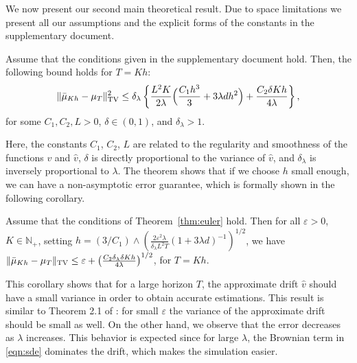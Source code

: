 We now present our second main theoretical result. Due to space limitations we present all our assumptions and the explicit forms of the constants in the supplementary document. 
\vspace{-5pt}
\begin{thm}
\label{thm:euler}
Assume that the conditions given in the supplementary document hold. Then, the following bound holds for $T=Kh$:
\begin{align}
\| \bar{\mu}_{Kh} - \mu_T \|_{\textnormal{TV}}^2 \leq \delta_\lambda \left \lbrace  \frac{L^2 K}{2\lambda} \Bigl( \frac{C_1 h^3}{3} + 3 \lambda d h^2 \Bigr) + \frac{C_2  \delta K h}{4\lambda} \right \rbrace	,
\end{align} 
for some $C_1,C_2,L >0$, $\delta \in (0,1)$, and $\delta_\lambda >1$.  %
\end{thm}
Here, the constants $C_1$, $C_2$, $L$ are related to the regularity and smoothness of the functions $v$ and $\hat{v}$, $\delta$ is directly proportional to the variance of $\hat{v}$, and $\delta_\lambda$ is inversely proportional to $\lambda$. The theorem shows that 
if we choose $h$ small enough, we can have a non-asymptotic error guarantee, which is formally shown in the following corollary. 
\vspace{-5pt}
\begin{cor}
  \label{coro:precision}
  Assume that the conditions of Theorem~\ref{thm:euler} hold. Then for all $\varepsilon >0$, $K \in \mathbb{N}_+$, setting
$h = (3/C_1)\wedge\left(\frac{2 \varepsilon^2 \lambda}{\delta_\lambda L^2 T}(1+3\lambda d)^{-1}\right)^{1/2}$, %
  we have
    $\| \bar{\mu}_{Kh} - \mu_T \|_{\textnormal{TV}} \leq \varepsilon + \left(\frac{C_2 \delta_\lambda \delta K h}{4\lambda}\right)^{1/2} $, for $T=Kh$. 
\end{cor}
This corollary shows that for a large horizon $T$, the approximate drift $\hat{v}$ should have a small variance in order to obtain accurate estimations. This result is similar to Theorem 2.1 of \cite{raginsky17a}: for small $\varepsilon$ the variance of the approximate drift should be small as well. On the other hand, we observe that the error decreases as $\lambda$ increases. This behavior is expected since for large $\lambda$, the Brownian term in \eqref{eqn:sde} dominates the drift, which makes the simulation easier.
